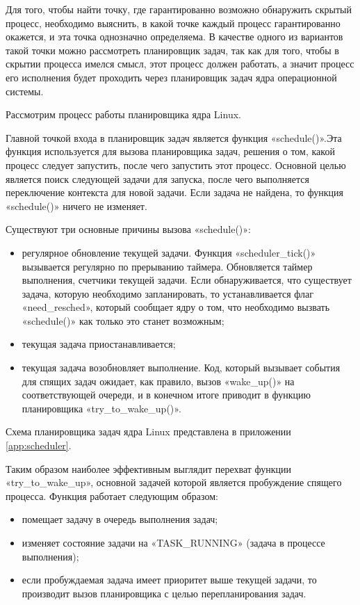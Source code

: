 \documentclass{gost7.32-2001}
\begin{document}
Для того, чтобы найти точку, где гарантированно возможно обнаружить
скрытый процесс, необходимо выяснить, в какой точке каждый процесс
гарантированно окажется, и эта точка однозначно определяема. В
качестве одного из вариантов такой точки можно рассмотреть планировщик
задач, так как для того, чтобы в скрытии процесса имелся смысл, этот
процесс должен работать, а значит процесс его исполнения будет
проходить через планировщик задач ядра операционной системы.

Рассмотрим процесс работы планировщика ядра Linux.

Главной точкой входа в планировщик задач является функция
«schedule()».Эта функция используется для вызова планировщика задач,
решения о том, какой процесс следует запустить, после чего запустить
этот процесс. Основной целью является поиск следующей задачи для
запуска, после чего выполняется переключение контекста для новой
задачи. Если задача не найдена, то функция «schedule()» ничего не
изменяет.

Существуют три основные причины вызова «schedule()»:
\begin{itemize}
\item
  регулярное обновление текущей задачи. Функция «scheduler\_tick()»
  вызывается регулярно по прерыванию таймера. Обновляется таймер
  выполнения, счетчики текущей задачи. Если обнаруживается, что
  существует задача, которую необходимо запланировать, то
  устанавливается флаг «need\_resched», который сообщает ядру о том,
  что необходимо вызвать «schedule()» как только это станет возможным;
\item
  текущая задача приостанавливается;
\item
  текущая задача возобновляет выполнение. Код, который вызывает
  события для спящих задач ожидает, как правило, вызов «wake\_up()» на
  соответствующей очереди, и в конечном итоге приводит в функцию
  планировщика «try\_to\_wake\_up()».
\end{itemize}

Схема планировщика задач ядра Linux представлена в приложении
\ref{app:scheduler}.

Таким образом наиболее эффективным выглядит перехват функции
«try\_to\_wake\_up», основной задачей которой является пробуждение
спящего процесса. Функция работает следующим образом:
\begin{itemize}
\item
  помещает задачу в очередь выполнения задач;
\item
  изменяет состояние задачи на «TASK\_RUNNING» (задача в процессе
  выполнения);
\item
  если пробуждаемая задача имеет приоритет выше текущей задачи, то
  производит вызов планировщика с целью перепланирования задач.
\end{itemize}
\end{document}

